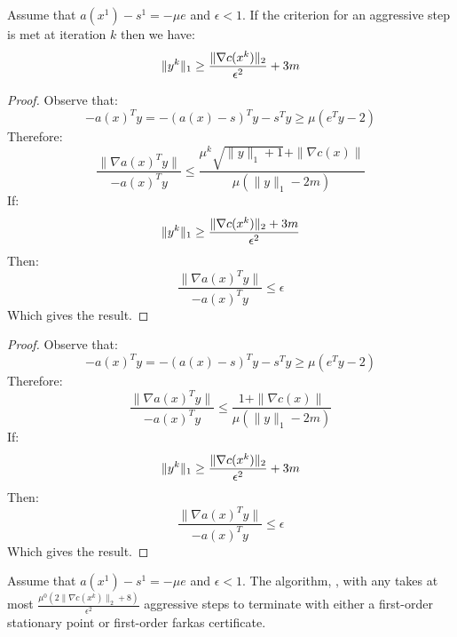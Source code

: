 \documentclass{article}
\begin{document}
\begin{lemma}
Assume that $a(x^{1}) - s^{1} = -\mu e$ and $\epsilon < 1$.
If the criterion for an aggressive step is met at iteration $k$ then we have:
$$
\| y^k \|_{1} \ge \frac{\| \nabla c(x^{k}) \|_{2}}{\epsilon^2} + 3 m
$$
\end{lemma}

\begin{proof}
Observe that:
$$-a(x)^T y = -(a(x) - s)^T y - s^T y \ge  \mu (e^T y - 2)$$
Therefore:
$$
\frac{\| \nabla a(x)^T y \|}{-a(x)^T y} \le \frac{\mu^k \sqrt{ \| y \|_{1} + 1} + \| \nabla c(x) \|}{\mu ( \| y \|_{1} - 2 m )} 
$$
If:
$$
\| y^k \|_{1} \ge \frac{\| \nabla c(x^{k}) \|_{2} +  3 m}{\epsilon^2} 
$$
Then:
$$
\frac{\| \nabla a(x)^T y \|}{-a(x)^T y} \le \epsilon 
$$
Which gives the result.
\end{proof}

\begin{proof}
Observe that:
$$-a(x)^T y = -(a(x) - s)^T y - s^T y \ge  \mu (e^T y - 2)$$
Therefore:
$$
\frac{\| \nabla a(x)^T y \|}{-a(x)^T y} \le \frac{1+ \| \nabla c(x) \|}{\mu ( \| y \|_{1} - 2 m )} 
$$
If:
$$
\| y^k \|_{1} \ge \frac{\| \nabla c(x^{k}) \|_{2}}{\epsilon^2} +  3 m
$$
Then:
$$
\frac{\| \nabla a(x)^T y \|}{-a(x)^T y} \le \epsilon 
$$
Which gives the result.
\end{proof}


\begin{lemma}
Assume that $a(x^{1}) - s^{1} = -\mu e$ and $\epsilon < 1$.
The algorithm, \callSimpleIPM{}, with any takes at most $\frac{\mu^{0} (2 \| \nabla c(x^{k}) \|_{2} + 8)}{\epsilon^2}$ aggressive steps to terminate with either a first-order stationary point or first-order farkas certificate.
\end{lemma}
\end{document}
